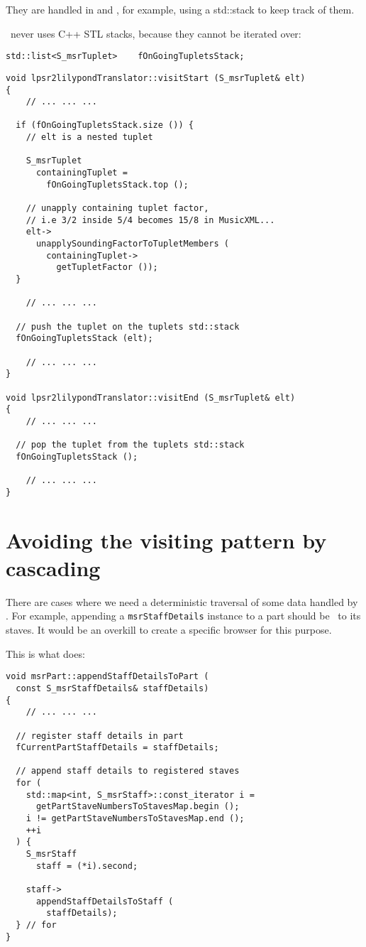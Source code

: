 They are handled in  and , for example, using a std::stack to keep track of them.

\mf\ never uses C++ STL stacks, because they cannot be iterated over:
\begin{lstlisting}[language=CPlusPlus]
    std::list<S_msrTuplet>    fOnGoingTupletsStack;
\end{lstlisting}

\begin{lstlisting}[language=CPlusPlus]
void lpsr2lilypondTranslator::visitStart (S_msrTuplet& elt)
{
	// ... ... ...

  if (fOnGoingTupletsStack.size ()) {
    // elt is a nested tuplet

    S_msrTuplet
      containingTuplet =
        fOnGoingTupletsStack.top ();

    // unapply containing tuplet factor,
    // i.e 3/2 inside 5/4 becomes 15/8 in MusicXML...
    elt->
      unapplySoundingFactorToTupletMembers (
        containingTuplet->
          getTupletFactor ());
  }

	// ... ... ...

  // push the tuplet on the tuplets std::stack
  fOnGoingTupletsStack (elt);

	// ... ... ...
}

void lpsr2lilypondTranslator::visitEnd (S_msrTuplet& elt)
{
	// ... ... ...

  // pop the tuplet from the tuplets std::stack
  fOnGoingTupletsStack ();

	// ... ... ...
}
\end{lstlisting}


\section{Avoiding the visiting pattern by cascading}

There are cases where we need a deterministic traversal of some data handled by \mf. For example, appending a {\tt msrStaffDetails} instance to a part should be \cascaded\ to its staves. It would be an overkill to create a specific browser for this purpose.

This is what  does:
\begin{lstlisting}[language=CPlusPlus]
void msrPart::appendStaffDetailsToPart (
  const S_msrStaffDetails& staffDetails)
{
	// ... ... ...

  // register staff details in part
  fCurrentPartStaffDetails = staffDetails;

  // append staff details to registered staves
  for (
    std::map<int, S_msrStaff>::const_iterator i =
      getPartStaveNumbersToStavesMap.begin ();
    i != getPartStaveNumbersToStavesMap.end ();
    ++i
  ) {
    S_msrStaff
      staff = (*i).second;

    staff->
      appendStaffDetailsToStaff (
        staffDetails);
  } // for
}
\end{lstlisting}

